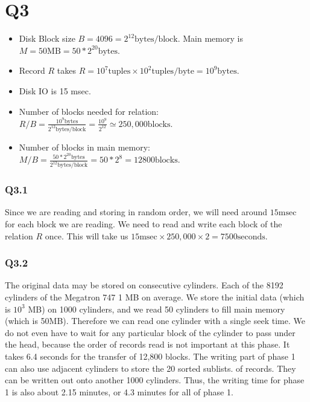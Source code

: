 \documentclass{article}
\begin{document}
\section{Q3}

\begin{itemize}
    \item Disk Block size $B = 4096 = 2^12 \text{bytes/block}$. Main memory is $M = 50 \text{MB} = 50 * 2^{20} \text{bytes}$. 
    \item Record $R$
        takes $R = 10^7\text{tuples} \times 10^2 \text{tuples/byte} = 10^9 \text{bytes}$.
    \item Disk IO is 15 msec.
    \item Number of blocks needed for relation: $R/B = \frac{10^9 \text{bytes}}{2^{12} \text{bytes/block}} = \frac{10^9}{2^{12}} \simeq 250,000 \text{blocks}$.
    \item Number of blocks in main memory: $M/B = \frac{50*2^{20}\text{bytes}}{2^{12} \text{bytes/block}} = 50 * 2^{8} = 12800 \text{blocks}$.
\end{itemize}

\subsubsection{Q3.1}
Since we are reading and storing in random order, we will need around $15\text{msec}$
for each block we are reading. 
We need to read and write each block of the relation $R$ once. This will take us
$15\text{msec} \times 250,000 \times 2= 7500 \text{seconds}$.

\subsubsection{Q3.2}
The original data may be stored on consecutive cylinders. Each of the 8192
cylinders of the Megatron 747 1 MB on average. We store the initial
data (which is $10^3$ MB) on 1000 cylinders, and we read 50 cylinders to fill
main memory (which is 50MB). Therefore we can read one cylinder with a single
seek time. We do not even have to wait for any particular block of the cylinder
to pass under the head, because the order of records read is not important at
this phase. It takes 6.4 seconds for the transfer of 12,800 blocks.
The writing part of phase 1 can also use adjacent cylinders to store the 20
sorted sublists. of records. They can be written out onto another 1000 cylinders.
Thus, the writing time for phase 1 is also about 2.15
minutes, or 4.3 minutes for all of phase 1.
\end{document}
